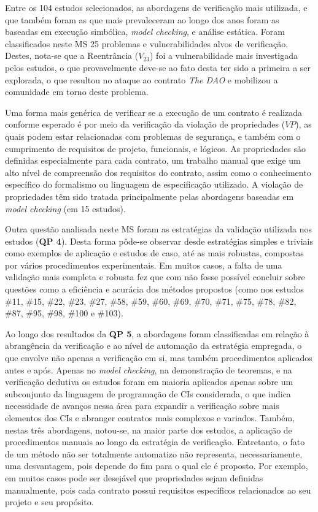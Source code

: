Entre os 104 estudos selecionados, as abordagens de verificação mais utilizada, e que também foram as que mais prevaleceram ao longo dos anos foram as baseadas em execução simbólica, \textit{model checking}, e análise estática. Foram classificados neste MS 25 problemas e vulnerabilidades alvos de verificação. Destes, nota-se que a Reentrância ($V_{23}$) foi a vulnerabilidade mais investigada pelos estudos, o que provavelmente deve-se ao fato desta ter sido a primeira a ser explorada, o que resultou no ataque ao contrato \textit{The DAO} e mobilizou a comunidade em torno deste problema. 

Uma forma mais genérica de verificar se a execução de um contrato é realizada conforme esperado é por meio da verificação da violação de propriedades ($VP$), as quais podem estar relacionadas com problemas de segurança, e também com o cumprimento de requisitos de projeto, funcionais, e lógicos. As propriedades são definidas especialmente para cada contrato, um trabalho manual que exige um alto nível de compreensão dos requisitos do contrato, assim como o conhecimento específico do formalismo ou linguagem de especificação utilizado. A violação de propriedades têm sido tratada principalmente pelas abordagens baseadas em \textit{model checking} (em 15 estudos).

Outra questão analisada neste MS foram as estratégias da validação utilizada nos estudos (\textbf{QP 4}). Desta forma pôde-se observar desde estratégias simples e triviais como exemplos de aplicação e estudos de caso, até as mais robustas, compostas por vários procedimentos experimentais. Em muitos casos, a falta de uma validação mais completa e robusta fez que com não fosse possível concluir sobre questões como a eficiência e acurácia dos métodos propostos (como nos estudos \#11, \#15, \#22, \#23, \#27, \#58, \#59, \#60, \#69, \#70, \#71, \#75, \#78, \#82, \#87, \#95, \#98, \#100 e \#103).  

Ao longo dos resultados da \textbf{QP 5}, a abordagens foram classificadas em relação à abrangência da verificação e ao nível de automação da estratégia empregada, o que envolve não apenas a verificação em si, mas também procedimentos aplicados antes e após. Apenas no \textit{model checking}, na demonstração de teoremas, e na verificação dedutiva os estudos foram em maioria aplicados apenas sobre um subconjunto da linguagem de programação de CIs considerada, o que indica necessidade de avanços nessa área para expandir a verificação sobre mais elementos dos CIs e abranger contratos mais complexos e variados. Também, nestas três abordagens, notou-se, na maior parte dos estudos, a aplicação de procedimentos manuais ao longo da estratégia de verificação. Entretanto, o fato de um método não ser totalmente automatizo não representa, necessariamente, uma desvantagem, pois depende do fim para o qual ele é proposto. Por exemplo, em muitos casos pode ser desejável que propriedades sejam definidas manualmente, pois cada contrato possui requisitos específicos relacionados ao seu projeto e seu propósito.

